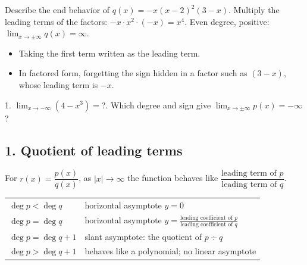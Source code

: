 \begin{example}
Describe the end behavior of $q(x)=-x(x-2)^2(3-x)$.
\sol Multiply the leading terms of the factors: $-x\cdot x^2\cdot(-x)=x^4$. Even degree, positive: $\lim_{x\to\pm\infty}q(x)=\infty$.
\end{example}

\begin{mistakes}
\begin{itemize}
\item Taking the first term written as the leading term.
\item In factored form, forgetting the sign hidden in a factor such as $(3-x)$, whose leading term is $-x$.
\end{itemize}
\end{mistakes}

\begin{quickcheck}
1. $\lim_{x\to-\infty}(4-x^3)=$?. Which degree and sign give $\lim_{x\to\pm\infty}p(x)=-\infty$?
\end{quickcheck}


\subsection*{1. Quotient of leading terms}
For $r(x)=\dfrac{p(x)}{q(x)}$, as $|x|\to\infty$ the function behaves like $\dfrac{\text{leading term of }p}{\text{leading term of }q}$.

\begin{keyidea}
\begin{tabular}{@{}ll@{}}
$\deg p<\deg q$ & horizontal asymptote $y=0$\\
$\deg p=\deg q$ & horizontal asymptote $y=\frac{\text{leading coefficient of }p}{\text{leading coefficient of }q}$\\
$\deg p=\deg q+1$ & slant asymptote: the quotient of $p\div q$\\
$\deg p>\deg q+1$ & behaves like a polynomial; no linear asymptote
\end{tabular}
\end{keyidea}

